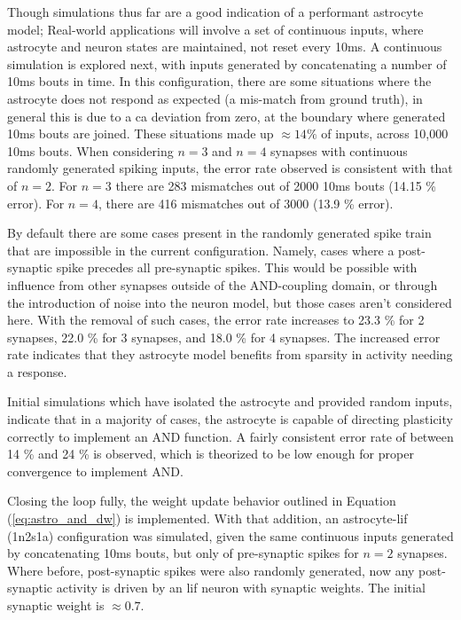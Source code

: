 \documentclass[conference]{IEEEtran}
\newcommand{\ca}{\gls{ca}\textrm{ }}
\newcommand{\eq}[1]{Equation (\ref{#1})}
\begin{document}
Though simulations thus far are a good indication of a performant astrocyte
model; Real-world applications will involve a set of continuous inputs, where
astrocyte and neuron states are maintained, not reset every 10ms. A continuous
simulation is explored next, with inputs generated by concatenating a number of
10ms bouts in time. In this configuration, there are some situations where the
astrocyte does not respond as expected (a mis-match from ground truth), in
general this is due to a \ca deviation from zero, at the boundary where
generated 10ms bouts are joined. These situations made up $\approx 14\%$ of
inputs, across 10,000 10ms bouts. When considering $n=3$ and $n=4$ synapses with
continuous randomly generated spiking inputs, the error rate observed is
consistent with that of $n=2$. For $n=3$ there are 283 mismatches out of 2000
10ms bouts (14.15 \% error). For $n=4$, there are 416 mismatches out of 3000
(13.9 \% error).

By default there are some cases present in the randomly generated spike train
that are impossible in the current configuration. Namely, cases where a
post-synaptic spike precedes all pre-synaptic spikes. This would be possible
with influence from other synapses outside of the AND-coupling domain, or
through the introduction of noise into the neuron model, but those cases aren't
considered here. With the removal of such cases, the error rate increases to
23.3 \% for 2 synapses, 22.0 \% for 3 synapses, and 18.0 \% for 4 synapses. The
increased error rate indicates that they astrocyte model benefits from sparsity
in activity needing a response.

Initial simulations which have isolated the astrocyte and provided random
inputs, indicate that in a majority of cases, the astrocyte is capable of
directing plasticity correctly to implement an AND function. A fairly consistent
error rate of between 14 \% and 24 \% is observed, which is theorized to be low
enough for proper convergence to implement AND.

Closing the loop fully, the weight update behavior outlined in
\eq{eq:astro_and_dw} is implemented. With that addition, an astrocyte-\gls{lif}
(1n2s1a) configuration was simulated, given the same continuous inputs generated
by concatenating 10ms bouts, but only of pre-synaptic spikes for $n=2$
synapses. Where before, post-synaptic spikes were also randomly generated, now
any post-synaptic activity is driven by an \gls{lif} neuron with synaptic
weights. The initial synaptic weight is $\approx 0.7$.
\end{document}
